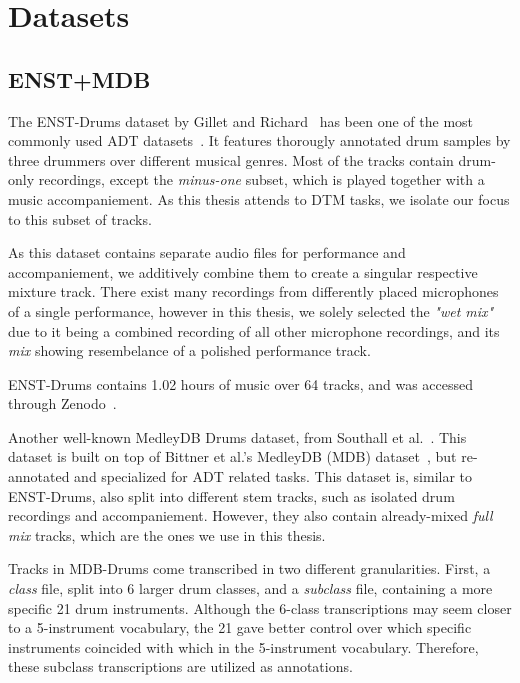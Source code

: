 \chapter{Datasets}\label{Datasets}

\section{ENST+MDB}

The ENST-Drums dataset by Gillet and Richard~\cite{gillet2006enst} has been one of the most commonly used \gls{ADT} datasets~\cite{8350302}. It features thorougly annotated drum samples by three drummers over different musical genres. Most of the tracks contain drum-only recordings, except the \textit{minus-one} subset, which is played together with a music accompaniement. As this thesis attends to \gls{DTM} tasks, we isolate our focus to this subset of tracks.

As this dataset contains separate audio files for performance and accompaniement, we additively combine them to create a singular respective mixture track. There exist many recordings from differently placed microphones of a single performance, however in this thesis, we solely selected the \textit{"wet mix"} due to it being a combined recording of all other microphone recordings, and its \textit{mix} showing resembelance of a polished performance track.

ENST-Drums contains 1.02 hours of music over 64 tracks, and was accessed through Zenodo~\cite{gillet_2006_7432188}.

Another well-known MedleyDB Drums dataset, from Southall et al.~\cite{southall2017mdb}. This dataset is built on top of Bittner et al.'s MedleyDB (MDB) dataset~\cite{bittner2014medleydb}, but re-annotated and specialized for \gls{ADT} related tasks. This dataset is, similar to ENST-Drums, also split into different stem tracks, such as isolated drum recordings and accompaniement. However, they also contain already-mixed \textit{full mix} tracks, which are the ones we use in this thesis.

Tracks in MDB-Drums come transcribed in two different granularities. First, a \textit{class} file, split into 6 larger drum classes, and a \textit{subclass} file, containing a more specific 21 drum instruments. Although the 6-class transcriptions may seem closer to a 5-instrument vocabulary, the 21 gave better control over which specific instruments coincided with which in the 5-instrument vocabulary. Therefore, these subclass transcriptions are utilized as annotations.

